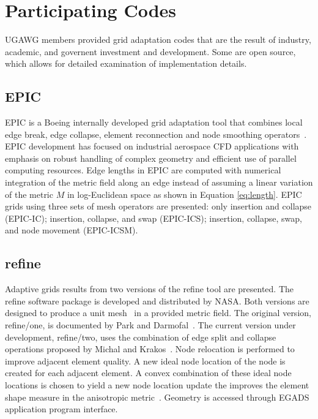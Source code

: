 \documentclass[3p,times,procedia,number]{elsarticle}
\begin{document}
\section{Participating Codes}
\label{sec:codes}

UGAWG members provided grid adaptation codes that are the result of
industry, academic, and governent investment and development.
Some are open source, which allows for detailed examination of
implementation details.

\subsection{EPIC}

EPIC is a Boeing internally developed grid adaptation tool that combines
local edge break, edge collapse, element reconnection and node smoothing
operators~\cite{michal-krakos-aniso-adapt-edge,michal-unstruct-adapt-epic-dpw6}.
EPIC development has focused on industrial aerospace CFD
applications with emphasis on robust handling of complex geometry and
efficient use of parallel computing resources. Edge lengths in EPIC are
computed with numerical integration of the metric field along an edge
instead of assuming a linear variation of the metric $M$ in log-Euclidean space
as shown in Equation \ref{eq:length}.
EPIC grids using three sets of mesh operators are presented:
only insertion and collapse (EPIC-IC); insertion, collapse, and swap (EPIC-ICS);
insertion, collapse, swap, and node movement (EPIC-ICSM).

\subsection{refine}

Adaptive grids results from two versions of the refine tool are presented.
The refine software package is developed and distributed by NASA.
Both versions are designed to produce a
unit mesh~\cite{loseille-alauzet-siamjna-2011-cont-mesh-framework-1}
in a provided metric field.
The original version, refine/one, is documented
by Park and Darmofal~\cite{park-darmofal-parallel-aniso-adapt-aiaa}.
The current version under development, refine/two,
uses the combination of edge split and collapse operations
proposed by Michal and Krakos~\cite{michal-krakos-aniso-adapt-edge}.
Node relocation is performed to improve adjacent element quality.
A new ideal node location of the node is created
for each adjacent element.
A convex combination of these ideal node locations is chosen
to yield a new node location update the improves
the element shape measure in the anisotropic
metric~\cite{alauzet-topology-moving-mesh}.
Geometry is accessed through EGADS
application program interface.
\end{document}
